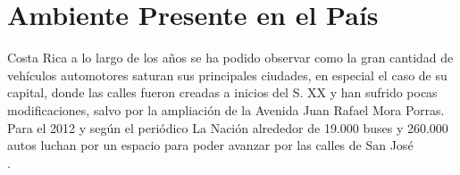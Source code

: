 \documentclass[conference]{IEEEtran}
\begin{document}
\section{Ambiente Presente en el Pa\'{i}s}
%
%



% 
% 
% 
% 
 Costa Rica a lo largo de los a\~{n}os se ha podido observar como la gran
	cantidad de veh\'{i}culos automotores saturan sus principales ciudades, en especial
	el caso de su capital, donde las calles fueron creadas a inicios del S. XX y han sufrido pocas modificaciones, salvo por la ampliaci\'on de la Avenida Juan Rafael Mora Porras. Para el 2012 y seg\'{u}n el peri\'{o}dico La Naci\'{o}n
	alrededor de 19.000 buses y 260.000 autos luchan por un espacio para poder avanzar por las calles de San Jos\'{e} \cite{Villegas2012}\\ .
	
\end{document}

